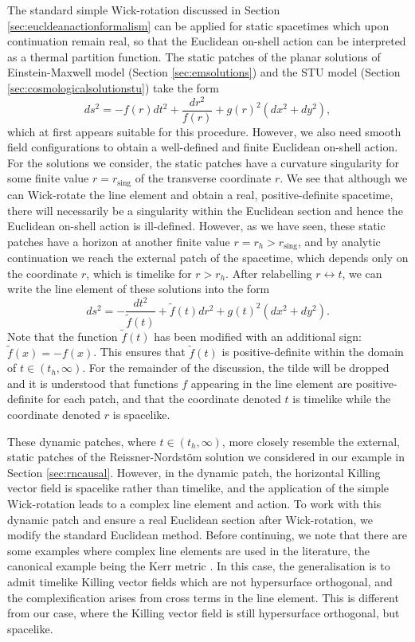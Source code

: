The standard simple Wick-rotation discussed in Section \ref{sec:eucldeanactionformalism} can be applied for static spacetimes which upon continuation remain real, so that the Euclidean on-shell action can be interpreted as a thermal partition function. The static patches of the planar solutions of Einstein-Maxwell model (Section \ref{sec:emsolutions}) and the STU model (Section \ref{sec:cosmologicalsolutionstu}) take the form
\begin{equation}
\label{static_patch}
ds^2 = - f(r) dt^2 + \frac{dr^2}{f(r)} + g(r)^2 (dx^2 + dy^2),
\end{equation}
which at first appears suitable for this procedure. However, we also need smooth field configurations to obtain a well-defined and finite Euclidean on-shell action. For the solutions we consider,  the static patches have a curvature singularity for some finite value $r=r_{\text{sing}}$ of the transverse coordinate $r$. We see that although we can Wick-rotate the line element and obtain a real, positive-definite spacetime, there will necessarily be a singularity within the Euclidean section and hence the Euclidean on-shell action is ill-defined. However, as we have seen, these static patches have a horizon at another finite value $r=r_h>r_{\text{sing}}$, and by analytic continuation we reach the external patch of the spacetime, which depends only on the coordinate $r$, which is timelike for $r  >r_h$. After relabelling $r \leftrightarrow t$, we can write the line element of these solutions into the form
\begin{equation}
\label{dynamic_patch}
ds^2 = - \frac{dt^2}{\tilde{f}(t)} + \tilde{f}(t) dr^2 + g(t)^2 (dx^2 + dy^2).
\end{equation}
Note that the function $\tilde{f}(t)$ has been modified with an additional sign: $\tilde{f}(x) = -f(x)$. This ensures that $\tilde{f}(t)$ is positive-definite within the domain of $t \in (t_h, \infty)$. For the remainder of the discussion, the tilde will be dropped and it is understood that functions $f$ appearing in the line element are positive-definite for each patch, and that the coordinate denoted $t$ is timelike while the coordinate denoted $r$ is spacelike.

These dynamic patches, where $t \in (t_h, \infty)$, more closely resemble the external, static patches of the Reissner-Nordst\"om solution we considered in our example in Section \ref{sec:rncausal}. However, in the dynamic patch, the horizontal Killing vector field is spacelike rather than timelike, and the application of the simple Wick-rotation leads to a complex line element and action. To work with this dynamic patch and ensure a real Euclidean section after Wick-rotation, we modify the standard Euclidean method. Before continuing, we note that there are some examples where complex line elements are used in the literature, the canonical example being the Kerr metric \cite{Gibbons:1976ue}. In this case, the generalisation is to admit timelike Killing vector fields which are not hypersurface orthogonal, and the complexification arises from cross terms in the line element. This is different from our case, where the Killing vector field is still hypersurface orthogonal, but spacelike. 

